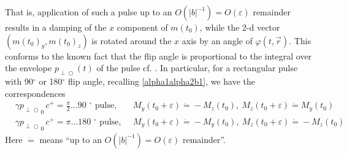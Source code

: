 \documentclass{ws-m3as}
\def\pp{p_{\perp\!\!\!\!\!\bigcirc}}
\def\bb{b}
\newcommand\taup{\varepsilon}
\begin{document}
That is, application of such a pulse up to an $O(|\bb|^{-1})=O(\taup)$ remainder results in a damping of the $x$ component of $m(t_0)$, while the 2-d vector $(m(t_0)_y,m(t_0)_z)$ is rotated around the $x$ axis by an angle of $\varphi(t,\vec r)$.
This conforms to the known fact that the flip angle is proportional to the integral over the envelope $\pp(t)$ of the pulse cf. \cite[page 10]{Uecker2009NonlinearRM}. 
In particular, for a rectangular pulse with 90${}^{\circ}$ or 180${}^{\circ}$ flip angle, recalling \eqref{alpha1alpha2b1}, we have the correspondences
\begin{equation}\label{90-180_rect}
\begin{aligned}
&\gamma{\pp}_0\,c^+=
\frac{\pi}{2}\text{\ldots 90 ${}^{\circ}$ pulse}, \quad &&
M_y(t_0+\taup)\dot{=}-M_z(t_0), \ M_z(t_0+\taup)\dot{=}M_y(t_0)\\
&\gamma{\pp}_0\,c^+=
\pi\text{\ldots 180 ${}^{\circ}$ pulse}, &&
M_y(t_0+\taup)\dot{=}-M_y(t_0), \ M_z(t_0+\taup)\dot{=}-M_z(t_0) 
\end{aligned}
\end{equation}
Here $\dot{=}$ means ``up to an $O(|\bb|^{-1})=O(\taup)$ remainder''.

\medskip
\end{document}

